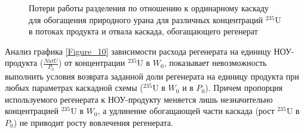 

\begin{figure}[ht]
  \caption{Потери работы разделения по отношению к ординарному каскаду для обогащения природного урана для различных концентраций $^{235}$U в потоках продукта и отвала каскада, обогащающего регенерат}\label{Figure_13}
\end{figure}

Анализ графика \ref{Figure_10} зависимости расхода регенерата на единицу НОУ-продукта ($\frac{NatU}{P_{0}}$) от концентрации $^{235}$U в $W_0$, показывает невозможность выполнить условия возврата заданной доли регенерата на единицу продукта при любых параметрах каскадной схемы ($^{235}$U в $W_0$ и в $P_0$). Причем пропорция используемого регенерата к НОУ-продукту меняется лишь незначительно концентрацией $^{235}$U в $W_0$, а удлинение обогащающей части каскада (рост $^{235}$U в $P_0$) не приводит росту вовлечения регенерата.

